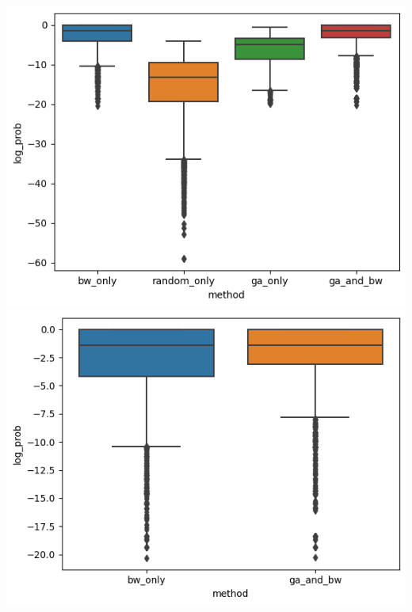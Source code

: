 \includegraphics[width=0.5\linewidth]{images/charts/slimane_log_prob_comparison.png}
\includegraphics[width=0.5\linewidth]{images/charts/slimane_log_prob_comparison_showdown.png}

